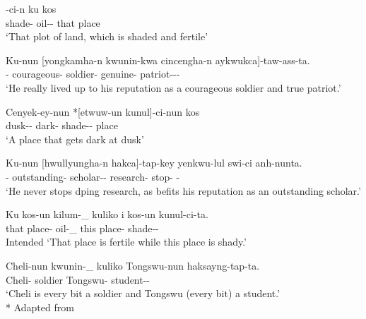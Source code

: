 \begin{exe}
    \ex \label{koreanlexical}
    \begin{xlist}
    \ex \label{koreanconjoined1}
    -ci-n ku kos \\ 
    shade-{\And} oil-{\Der}-{\Rel} that place \\
    \glt `That plot of land, which is shaded and fertile'
    
    \ex \label{koreanconjoined2}
    \gll Ku-nun [yongkamha-n kwunin-kwa cincengha-n aykwukca]-taw-ass-ta.\\
    {\Tsg}-{\Top} courageous-{\Rel} soldier-{\And} genuine-{\Rel} patriot-{\Der}-{\Pst}-{\Decl} \\
    \glt `He really lived up to his reputation as a courageous soldier and true patriot.'
 
    
    \ex \label{koreanmodified1}
    \gll Cenyek-ey-nun *[etwuw-un kunul]-ci-nun kos \\
    dusk-{\Loc}-{\Top} dark-{\Rel} shade-{\Der}-{\Rel} place\\
    \glt `A place that gets dark at dusk'
    
    \ex \label{koreanmodified2}
    \gll Ku-nun [hwullyungha-n hakca]-tap-key yenkwu-lul swi-ci anh-nunta. \\
    {\Tsg}-{\Top} outstanding-{\Rel} scholar-{\Der}-{\Comp} research-{\Acc} stop-{\Comp} {\Neg}-{\Prs} \\
    \glt `He never stops dping research, as befits his reputation as an outstanding scholar.'
    
    
    \ex \label{koreangapping1}
    \gll *Ku kos-un kilum-\_ kuliko i kos-un kunul-ci-ta. \\
    that place-{\Top} oil-\_ {\And} this place-{\Top} shade-{\Der}-{\Decl} \\
    \glt Intended `That place is fertile while this place is shady.'
    
    \ex \label{koreangapping2}
    \gll Cheli-nun kwunin-\_ kuliko Tongswu-nun haksayng-tap-ta. \\ 
    Cheli-{\Top} soldier {\And} Tongswu-{\Top} student-{\Der}-{\Decl} \\
    \glt `Cheli is every bit a soldier and Tongswu (every bit) a student.'\\*
    \hfill Adapted from \citet{yoon2017lexical}
    \end{xlist}
\end{exe}

